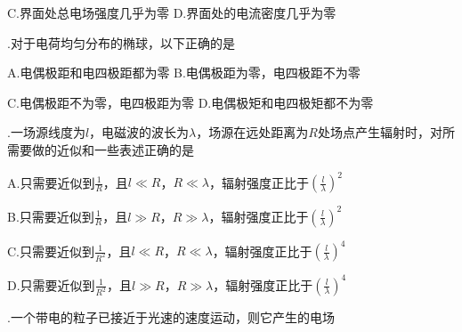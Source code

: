 C.\hspace{0.8em}界面处总电场强度几乎为零\hspace{7em}
D.\hspace{0.8em}界面处的电流密度几乎为零
\vspace{0.2cm}

.\hspace{0.8em}对于电荷均匀分布的椭球，以下正确的是
\vspace{0.2cm}

A.\hspace{0.8em}电偶极距和电四极距都为零\hspace{8em}
B.\hspace{0.8em}电偶极距为零，电四极距不为零\vspace{0.1cm}

C.\hspace{0.8em}电偶极距不为零，电四极距为零\hspace{6em}
D.\hspace{0.8em}电偶极矩和电四极矩都不为零\vspace{0.2cm}

.\hspace{0.8em}一场源线度为$l$，电磁波的波长为$\lambda$，场源在远处距离为$R$处场点产生辐射时，对所需要做的近似和一些表述正确的是
\vspace{0.2cm}

A.\hspace{0.8em}只需要近似到$\displaystyle{\frac{1}{R}}$，且$l \ll R$，$R \ll \lambda$，辐射强度正比于$\displaystyle{(\frac{l}{\lambda})^2}$\vspace{0.2cm}

B.\hspace{0.8em}只需要近似到$\displaystyle{\frac{1}{R}}$，且$l \gg R$，$R \gg \lambda$，辐射强度正比于$\displaystyle{(\frac{l}{\lambda})^2}$\vspace{0.2cm}

C.\hspace{0.8em}只需要近似到$\displaystyle{\frac{1}{R^2}}$，且$l \ll R$，$R \ll \lambda$，辐射强度正比于$\displaystyle{(\frac{l}{\lambda})^4}$\vspace{0.2cm}

D.\hspace{0.8em}只需要近似到$\displaystyle{\frac{1}{R^2}}$，且$l \gg R$，$R \gg \lambda$，辐射强度正比于$\displaystyle{(\frac{l}{\lambda})^4}$

\newpage

.\hspace{0.8em}一个带电的粒子已接近于光速的速度运动，则它产生的电场
\vspace{0.2cm}

